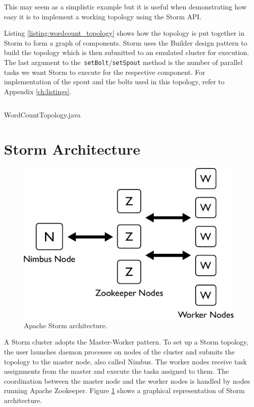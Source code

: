 \documentclass[bsc,twoside,singlespacing,normalheadings,parskip]{infthesis}\usepackage[]{graphicx}\usepackage[]{color}
\begin{document}
This may seem as a simplistic example but it is useful when demonstrating how easy it is to implement a working topology using the Storm API.

Listing \ref{listing:wordcount_topology} shows how the topology is put together in Storm to form a graph of components. Storm uses the Builder design pattern \citep{gamma1994design} to build the topology which is then submitted to an emulated cluster for execution. The last argument to the~\texttt{setBolt}/\texttt{setSpout} method is the number of parallel tasks we want Storm to execute for the respective component. For implementation of the spout and the bolts used in this topology, refer to Appendix \ref{ch:listings}.

\begin{listing}[!htb]
\inputminted{java}{code/WordCountTopology.java}
\caption{WordCountTopology.java}
\label{listing:wordcount_topology}
\end{listing}

\section{Storm Architecture}
\label{sec:storm_arch}

\begin{figure}[!htb]
	\centering
	\includegraphics[scale=0.4]{pdf/storm_arch.pdf}
	\caption{Apache Storm architecture.}
	\label{fig:storm_arch}
\end{figure}


A Storm cluster adopts the Master-Worker pattern. To set up a Storm topology, the user launches daemon processes on nodes of the cluster and submits the topology to the master node, also called Nimbus. The worker nodes receive task assignments from the master and execute the tasks assigned to them. The coordination between the master node and the worker nodes is handled by nodes running Apache Zookeeper. Figure \ref{fig:storm_arch} shows a graphical representation of Storm architecture.
\end{document}
